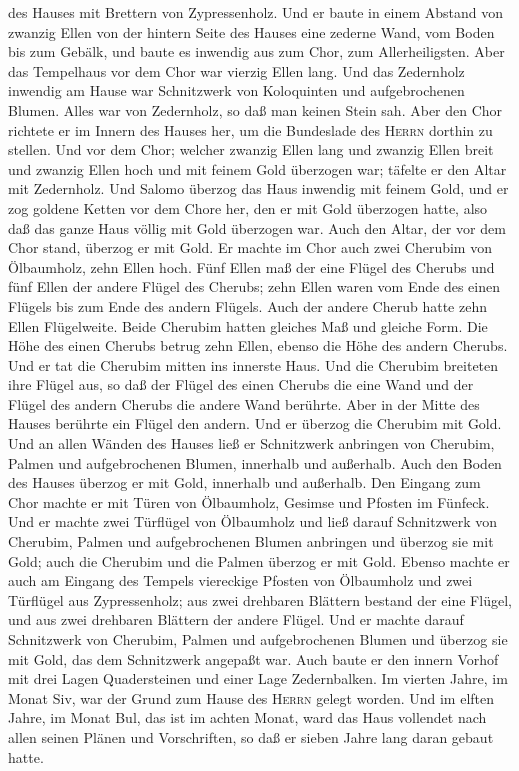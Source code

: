 des Hauses mit Brettern von Zypressenholz.  Und er baute
in einem Abstand von zwanzig Ellen von der hintern Seite des Hauses eine
zederne Wand, vom Boden bis zum Gebälk, und baute es inwendig aus zum
Chor, zum Allerheiligsten.  Aber das Tempelhaus vor dem
Chor war vierzig Ellen lang.  Und das Zedernholz inwendig
am Hause war Schnitzwerk von Koloquinten und aufgebrochenen Blumen.
Alles war von Zedernholz, so daß man keinen Stein sah. 
Aber den Chor richtete er im Innern des Hauses her, um die Bundeslade
des \textsc{Herrn} dorthin zu stellen.  Und vor dem Chor;
welcher zwanzig Ellen lang und zwanzig Ellen breit und zwanzig Ellen
hoch und mit feinem Gold überzogen war; täfelte er den Altar mit
Zedernholz.  Und Salomo überzog das Haus inwendig mit
feinem Gold, und er zog goldene Ketten vor dem Chore her, den er mit
Gold überzogen hatte,  also daß das ganze Haus völlig mit
Gold überzogen war. Auch den Altar, der vor dem Chor stand, überzog er
mit Gold.  Er machte im Chor auch zwei Cherubim von
Ölbaumholz, zehn Ellen hoch.  Fünf Ellen maß der eine
Flügel des Cherubs und fünf Ellen der andere Flügel des Cherubs; zehn
Ellen waren vom Ende des einen Flügels bis zum Ende des andern Flügels.
 Auch der andere Cherub hatte zehn Ellen Flügelweite.
Beide Cherubim hatten gleiches Maß und gleiche Form.  Die
Höhe des einen Cherubs betrug zehn Ellen, ebenso die Höhe des andern
Cherubs.  Und er tat die Cherubim mitten ins innerste
Haus. Und die Cherubim breiteten ihre Flügel aus, so daß der Flügel des
einen Cherubs die eine Wand und der Flügel des andern Cherubs die andere
Wand berührte. Aber in der Mitte des Hauses berührte ein Flügel den
andern.  Und er überzog die Cherubim mit Gold.
 Und an allen Wänden des Hauses ließ er Schnitzwerk
anbringen von Cherubim, Palmen und aufgebrochenen Blumen, innerhalb und
außerhalb.  Auch den Boden des Hauses überzog er mit
Gold, innerhalb und außerhalb.  Den Eingang zum Chor
machte er mit Türen von Ölbaumholz, Gesimse und Pfosten im Fünfeck.
 Und er machte zwei Türflügel von Ölbaumholz und ließ
darauf Schnitzwerk von Cherubim, Palmen und aufgebrochenen Blumen
anbringen und überzog sie mit Gold; auch die Cherubim und die Palmen
überzog er mit Gold.  Ebenso machte er auch am Eingang
des Tempels viereckige Pfosten von Ölbaumholz  und zwei
Türflügel aus Zypressenholz; aus zwei drehbaren Blättern bestand der
eine Flügel, und aus zwei drehbaren Blättern der andere Flügel.
 Und er machte darauf Schnitzwerk von Cherubim, Palmen
und aufgebrochenen Blumen und überzog sie mit Gold, das dem Schnitzwerk
angepaßt war.  Auch baute er den innern Vorhof mit drei
Lagen Quadersteinen und einer Lage Zedernbalken.  Im
vierten Jahre, im Monat Siv, war der Grund zum Hause des \textsc{Herrn}
gelegt worden.  Und im elften Jahre, im Monat Bul, das
ist im achten Monat, ward das Haus vollendet nach allen seinen Plänen
und Vorschriften, so daß er sieben Jahre lang daran gebaut hatte.

